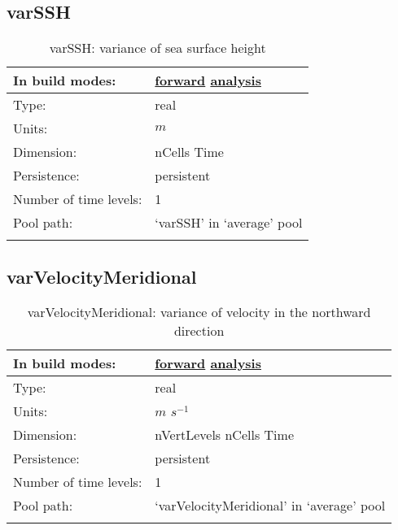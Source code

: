 \subsection[varSSH]{varSSH}
\label{subsec:var_sec_average_varSSH}
\begin{center}
\begin{longtable}{| p{2.0in} | p{4.0in} |}
        \hline 
        In build modes: & \hyperref[subsec:forward_var_tab_average]{forward} \hyperref[subsec:analysis_var_tab_average]{analysis} \\
        \hline 
        Type: & real \\
        \hline 
        Units: & $m$ \\
        \hline 
        Dimension: & nCells Time \\
        \hline 
        Persistence: & persistent \\
        \hline 
        Number of time levels: & 1 \\
        \hline 
            Pool path: & `varSSH' in `average' pool \\
		 \hline 
    \caption{varSSH: variance of sea surface height}
\end{longtable}
\end{center}
\subsection[varVelocityMeridional]{varVelocityMeridional}
\label{subsec:var_sec_average_varVelocityMeridional}
\begin{center}
\begin{longtable}{| p{2.0in} | p{4.0in} |}
        \hline 
        In build modes: & \hyperref[subsec:forward_var_tab_average]{forward} \hyperref[subsec:analysis_var_tab_average]{analysis} \\
        \hline 
        Type: & real \\
        \hline 
        Units: & $m$ $s^{-1}$ \\
        \hline 
        Dimension: & nVertLevels nCells Time \\
        \hline 
        Persistence: & persistent \\
        \hline 
        Number of time levels: & 1 \\
        \hline 
            Pool path: & `varVelocityMeridional' in `average' pool \\
		 \hline 
    \caption{varVelocityMeridional: variance of velocity in the northward direction}
\end{longtable}
\end{center}
